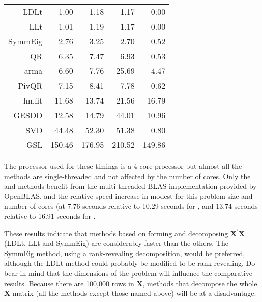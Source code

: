 \documentclass[shortnames,article]{jss}
\begin{document}
\begin{table}[tb]
\begin{tabular}{r r r r r}
     LDLt &    1.00 &    1.18 &      1.17 &     0.00 \\
      LLt &    1.01 &    1.19 &      1.17 &     0.00 \\
  SymmEig &    2.76 &    3.25 &      2.70 &     0.52 \\
       QR &    6.35 &    7.47 &      6.93 &     0.53 \\
     arma &    6.60 &    7.76 &     25.69 &     4.47 \\
    PivQR &    7.15 &    8.41 &      7.78 &     0.62 \\
   lm.fit &   11.68 &   13.74 &     21.56 &    16.79 \\
    GESDD &   12.58 &   14.79 &     44.01 &    10.96 \\
      SVD &   44.48 &   52.30 &     51.38 &     0.80 \\
      GSL &  150.46 &  176.95 &    210.52 &   149.86 \\
     \bottomrule
  \end{tabular}
\end{table}
The processor used for these timings is a 4-core processor but almost all the
methods are single-threaded and not affected by the number of cores.
Only the  and  methods benefit from 
the multi-threaded BLAS implementation provided by OpenBLAS, and the relative
speed increase in modest for this problem size and number of cores (at 7.76
seconds relative to 10.29 seconds for , and 13.74 seconds relative
to 16.91 seconds for . 

These results indicate that methods based on forming and decomposing
$\bm X^\prime\bm X$ (LDLt, LLt and SymmEig) are considerably
faster than the others.  The SymmEig method, using a rank-revealing
decomposition, would be preferred, although the LDLt method could
probably be modified to be rank-revealing.  Do bear in mind that the
dimensions of the problem will influence the comparative results.
Because there are 100,000 rows in $\bm X$, methods that decompose the
whole $\bm X$ matrix (all the methods except those named above) will
be at a disadvantage.
\end{document}

